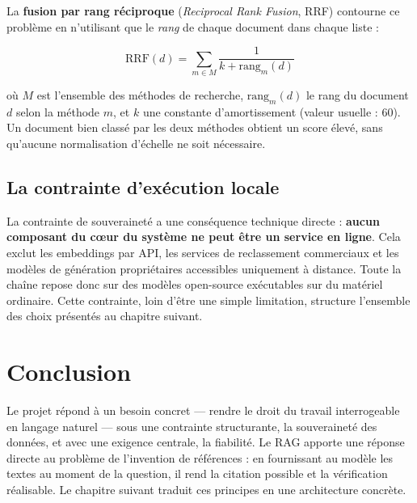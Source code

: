 La \textbf{fusion par rang réciproque} (\textit{Reciprocal Rank Fusion}, RRF) contourne ce
problème en n'utilisant que le \emph{rang} de chaque document dans chaque liste :

\begin{equation}
    \mathrm{RRF}(d) = \sum_{m \in M} \frac{1}{k + \mathrm{rang}_m(d)}
\end{equation}

où $M$ est l'ensemble des méthodes de recherche, $\mathrm{rang}_m(d)$ le rang du document $d$
selon la méthode $m$, et $k$ une constante d'amortissement (valeur usuelle : 60). Un document
bien classé par les deux méthodes obtient un score élevé, sans qu'aucune normalisation d'échelle
ne soit nécessaire.

\subsection{La contrainte d'exécution locale}

La contrainte de souveraineté a une conséquence technique directe : \textbf{aucun composant du
cœur du système ne peut être un service en ligne}. Cela exclut les embeddings par API, les
services de reclassement commerciaux et les modèles de génération propriétaires accessibles
uniquement à distance. Toute la chaîne repose donc sur des modèles open-source exécutables sur du
matériel ordinaire. Cette contrainte, loin d'être une simple limitation, structure l'ensemble des
choix présentés au chapitre suivant.

\newpage
\section*{Conclusion}

Le projet répond à un besoin concret --- rendre le droit du travail interrogeable en langage
naturel --- sous une contrainte structurante, la souveraineté des données, et avec une exigence
centrale, la fiabilité. Le RAG apporte une réponse directe au problème de l'invention de
références : en fournissant au modèle les textes au moment de la question, il rend la citation
possible et la vérification réalisable. Le chapitre suivant traduit ces principes en une
architecture concrète.
